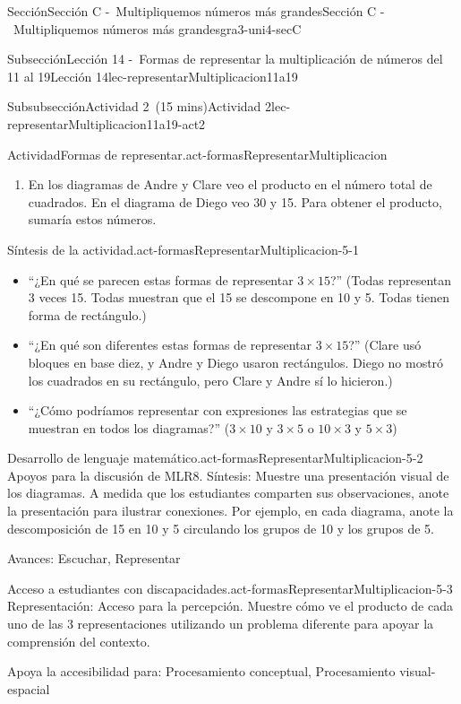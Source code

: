 \documentclass[oneside,10pt,]{article}
\begin{document}
\begin{sectionptx}{Sección}{Sección C -~Multipliquemos números más grandes}{}{Sección C -~Multipliquemos números más grandes}{}{}{gra3-uni4-secC}
\begin{subsectionptx}{Subsección}{Lección 14 -~Formas de representar la multiplicación de números del 11 al 19}{}{Lección 14}{}{}{lec-representarMultiplicacion11a19}
\begin{subsubsectionptx}{Subsubsección}{Actividad 2~(15 mins)}{}{Actividad 2}{}{}{lec-representarMultiplicacion11a19-act2}
\begin{activity}{Actividad}{Formas de representar.}{act-formasRepresentarMultiplicacion}
\begin{enumerate}
\item{}En los diagramas de Andre y Clare veo el producto en el número total de cuadrados. En el diagrama de Diego veo 30 y 15. Para obtener el producto, sumaría estos números.%
\end{enumerate}
\end{activity}%
\par
\begin{paragraphs}{Síntesis de la actividad.}{act-formasRepresentarMultiplicacion-5-1}%
%
\begin{itemize}[label=\textbullet]
\item{}``¿En qué se parecen estas formas de representar \(3 \times 15\)?'' (Todas representan 3 veces 15. Todas muestran que el 15 se descompone en 10 y 5. Todas tienen forma de rectángulo.)%
\item{}``¿En qué son diferentes estas formas de representar \(3 \times 15\)?'' (Clare usó bloques en base diez, y Andre y Diego usaron rectángulos. Diego no mostró los cuadrados en su rectángulo, pero Clare y Andre sí lo hicieron.)%
\item{}``¿Cómo podríamos representar con expresiones las estrategias que se muestran en todos los diagramas?'' (\(3 \times 10\) y \(3 \times 5\) o \(10\times 3\) y \(5\times 3\))%
\end{itemize}
\end{paragraphs}%
\begin{paragraphs}{Desarrollo de lenguaje matemático.}{act-formasRepresentarMultiplicacion-5-2}%
Apoyos para la discusión de MLR8. Síntesis: Muestre una presentación visual de los diagramas. A medida que los estudiantes comparten sus observaciones, anote la presentación para ilustrar conexiones. Por ejemplo, en cada diagrama, anote la descomposición de 15 en 10 y 5 circulando los grupos de 10 y los grupos de 5.%
\par
Avances: Escuchar, Representar%
\end{paragraphs}%
\begin{paragraphs}{Acceso a estudiantes con discapacidades.}{act-formasRepresentarMultiplicacion-5-3}%
Representación: Acceso para la percepción. Muestre cómo ve el producto de cada uno de las 3 representaciones utilizando un problema diferente para apoyar la comprensión del contexto.%
\par
Apoya la accesibilidad para: Procesamiento conceptual, Procesamiento visual-espacial%
\end{paragraphs}%
\end{subsubsectionptx}
%
%
\typeout{************************************************}

\end{subsectionptx}
\end{sectionptx}
\end{document}

